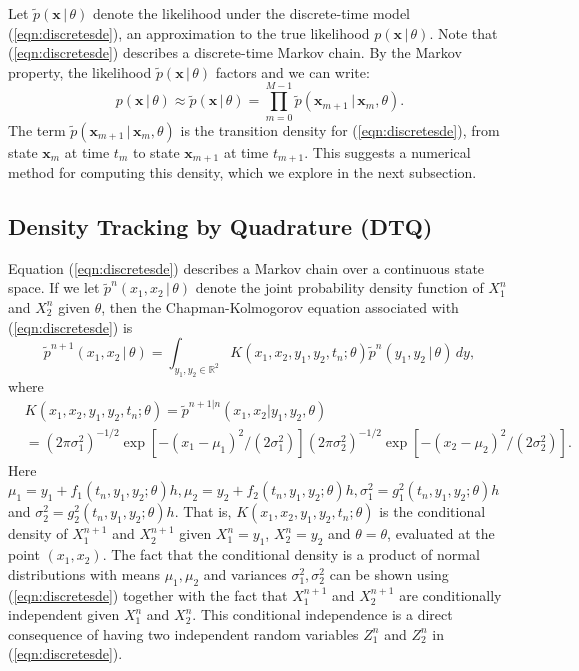 \documentclass[graybox]{svmult}
\begin{document}
Let $\widetilde{p}(\mathbf{x} \, | \, \theta)$ denote the likelihood under the discrete-time model (\ref{eqn:discretesde}), an approximation to the true likelihood $p(\mathbf{x} \, | \, \theta)$.  Note that (\ref{eqn:discretesde}) describes a discrete-time Markov chain.  By the Markov property, the likelihood $\widetilde{p}(\mathbf{x} \, | \, \theta)$ factors and we can write:
\begin{equation}
\label{eqn:markovfactor}
p(\mathbf{x} \, | \, \theta) \approx \widetilde{p}(\mathbf{x} \, | \, \theta) = \prod_{m=0}^{M-1} \widetilde{p}(\mathbf{x}_{m+1} \, | \, \mathbf{x}_m, \theta).
\end{equation}
The term $\widetilde{p}(\mathbf{x}_{m+1} \, | \, \mathbf{x}_m, \theta)$ is the transition density for (\ref{eqn:discretesde}), from state $\mathbf{x}_m$ at time $t_m$ to state $\mathbf{x}_{m+1}$ at time $t_{m+1}$.  This suggests a numerical method for computing this density, which we explore in the next subsection.
 
\subsection{Density Tracking by Quadrature (DTQ)}
\label{subsec:2-1}
Equation (\ref{eqn:discretesde}) describes a Markov chain over a continuous state space.  If we let $\widetilde{p}^n(x_1,x_2 \, | \, \theta)$ denote the joint probability density function of $X_1^n$ and $X_2^n$ given $\theta$, then the Chapman-Kolmogorov equation associated with (\ref{eqn:discretesde})  is
\begin{equation}
\label{eqn:chapman}
\widetilde{p}^{n+1}(x_1,x_2 \, | \, \theta) = \int_{y_1,y_2 \in \mathbb{R}^2} K(x_1,x_2,y_1,y_2,t_n; \theta) \widetilde{p}^n(y_1,y_2 \, | \, \theta) \, dy,
\end{equation}
where
\begin{align}
&K(x_1,x_2,y_1,y_2,t_n; \theta) = \widetilde{p}^{{n+1} | {n}}(x_1,x_2 | y_1,y_2,\theta) \nonumber\\
&= (2 \pi \sigma_1^2)^{-1/2} \exp \left[ -(x_1 - \mu_1)^2/(2 \sigma_1^2) \right] (2 \pi \sigma_2^2)^{-1/2} \exp \left[ -(x_2 - \mu_2)^2/(2 \sigma_2^2) \right]\nonumber.
\end{align}
Here $\mu_1 = y_1 + f_1(t_n,y_1,y_2; \theta) h,  \mu_2 = y_2 + f_2(t_n,y_1,y_2; \theta) h,  \sigma_1^2 = g_1^2(t_n,y_1,y_2; \theta) h$ and  $\sigma_2^2 = g_2^2(t_n,y_1,y_2; \theta) h$. That is, $K(x_1,x_2,y_1,y_2,t_n; \theta)$ is the conditional density of $X_1^{n+1}$ and $X_2^{n+1}$ given $X_1^n = y_1$, $X_2^n = y_2$ and $\theta = \theta$, evaluated at the point $(x_1,x_2)$.  The fact that the conditional density is a product of normal distributions with means $\mu_1, \mu_2$ and variances $\sigma_1^2, \sigma_2^2$ can be shown using (\ref{eqn:discretesde}) together with the fact that $X_1^{n+1}$ and $X_2^{n+1}$ are conditionally independent given $X_1^n$ and $X_2^n$. This conditional independence is a direct consequence of having two independent random variables $Z_1^n$ and $Z_2^n$ in (\ref{eqn:discretesde}).
\end{document}
